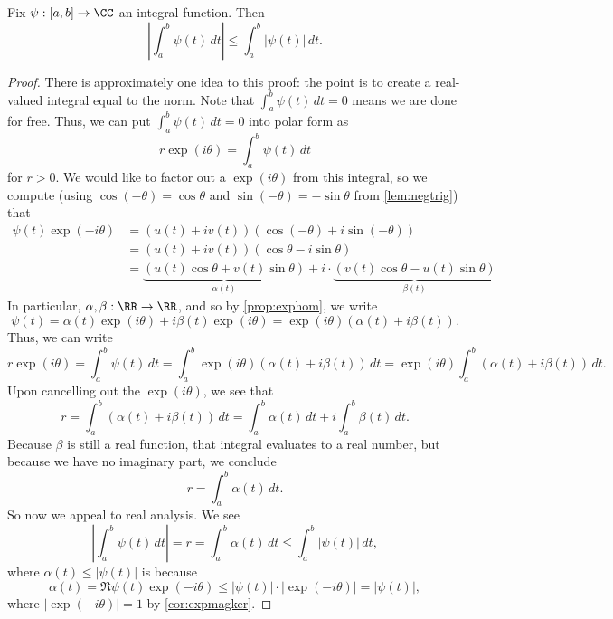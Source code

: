\begin{lemma}
	Fix $\psi:[a,b]\to\CC$ an integral function. Then
	\[\left|\int_a^b\psi(t)\,dt\right|\le\int_a^b|\psi(t)|\,dt.\]
\end{lemma}
\begin{proof}
	There is approximately one idea to this proof: the point is to create a real-valued integral equal to the norm. Note that $\int_a^b\psi(t)\,dt=0$ means we are done for free. Thus, we can put $\int_a^b\psi(t)\,dt=0$ into polar form as
	\[r\exp(i\theta)=\int_a^b\psi(t)\,dt\]
	for $r>0$. We would like to factor out a $\exp(i\theta)$ from this integral, so we compute (using $\cos(-\theta)=\cos\theta$ and $\sin(-\theta)=-\sin\theta$ from \autoref{lem:negtrig}) that
	\begin{align*}
		\psi(t)\exp(-i\theta) &= (u(t)+iv(t))(\cos(-\theta)+i\sin(-\theta)) \\
		&= (u(t)+iv(t))(\cos\theta-i\sin\theta) \\
		&= \underbrace{(u(t)\cos\theta+v(t)\sin\theta)}_{\alpha(t)}+i\cdot\underbrace{(v(t)\cos\theta-u(t)\sin\theta)}_{\beta(t)}
	\end{align*}
	In particular, $\alpha,\beta:\RR\to\RR$, and so by \autoref{prop:exphom}, we write
	\[\psi(t)=\alpha(t)\exp(i\theta)+i\beta(t)\exp(i\theta)=\exp(i\theta)(\alpha(t)+i\beta(t)).\]
	Thus, we can write
	\[r\exp(i\theta)=\int_a^b\psi(t)\,dt=\int_a^b\exp(i\theta)(\alpha(t)+i\beta(t))\,dt=\exp(i\theta)\int_a^b(\alpha(t)+i\beta(t))\,dt.\]
	Upon cancelling out the $\exp(i\theta)$, we see that
	\[r=\int_a^b(\alpha(t)+i\beta(t))\,dt=\int_a^b\alpha(t)\,dt+i\int_a^b\beta(t)\,dt.\]
	Because $\beta$ is still a real function, that integral evaluates to a real number, but because we have no imaginary part, we conclude
	\[r=\int_a^b\alpha(t)\,dt.\]
	So now we appeal to real analysis. We see
	\[\left|\int_a^b\psi(t)\,dt\right|=r=\int_a^b\alpha(t)\,dt\le\int_a^b|\psi(t)|\,dt,\]
	where $\alpha(t)\le|\psi(t)|$ is because
	\[\alpha(t)=\Re\psi(t)\exp(-i\theta)\le|\psi(t)|\cdot|\exp(-i\theta)|=|\psi(t)|,\]
	where $|\exp(-i\theta)|=1$ by \autoref{cor:expmagker}.
\end{proof}


